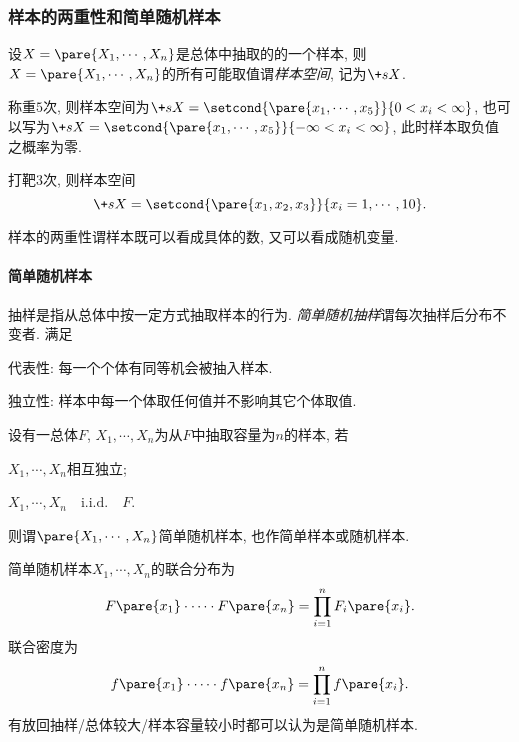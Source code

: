 \documentclass[../Statistics.tex]{subfiles}
\begin{document}

\subsubsection{样本的两重性和简单随机样本} %
\label{ssub:样本的两重性和简单随机样本}

设$X = \pare{X_1, \cdots, X_n}$是总体中抽取的的一个样本, 则$X=\pare{X_1,\cdots,X_n}$的所有可能取值谓\emph{样本空间}, 记为$\+sX$.
\begin{sample}
    \begin{ex}
        称重$5$次, 则样本空间为$\+sX = \setcond{\pare{x_1,\cdots,x_5}}{0<x_i<\infty}$, 也可以写为$\+sX = \setcond{\pare{x_1,\cdots,x_5}}{-\infty<x_i<\infty}$, 此时样本取负值之概率为零.
    \end{ex}
    \begin{ex}
        打靶$3$次, 则样本空间
        \[ \+sX = \setcond{\pare{x_1,x_2,x_3}}{x_i = 1,\cdots,10}. \]
    \end{ex}
\end{sample}
样本的两重性谓样本既可以看成具体的数, 又可以看成随机变量.

\paragraph{简单随机样本} %
\label{par:简单随机样本}

抽样是指从总体中按一定方式抽取样本的行为. \emph{简单随机抽样}谓每次抽样后分布不变者. 满足
\begin{cenum}
    \item 代表性: 每一个个体有同等机会被抽入样本.
    \item 独立性: 样本中每一个体取任何值并不影响其它个体取值.
\end{cenum}
\begin{definition}
    设有一总体$F$, $X_1,\cdots,X_n$为从$F$中抽取容量为$n$的样本, 若
    \begin{cenum}
        \item $X_1,\cdots,X_n$相互独立;
        \item $X_1,\cdots,X_n\quad \mathrm{i.i.d.} \quad F$.
    \end{cenum}
    则谓$\pare{X_1,\cdots,X_n}$简单随机样本, 也作简单样本或随机样本.
\end{definition}
简单随机样本$X_1, \cdots, X_n$的联合分布为
\[ F\pare{x_1}\cdot\cdots\cdot F\pare{x_n} = \prod_{i=1}^n F_i\pare{x_i}. \]
联合密度为
\[ f\pare{x_1}\cdot\cdots\cdot f\pare{x_n} = \prod_{i=1}^n f\pare{x_i}. \]
有放回抽样/总体较大/样本容量较小时都可以认为是简单随机样本.
\end{document}

